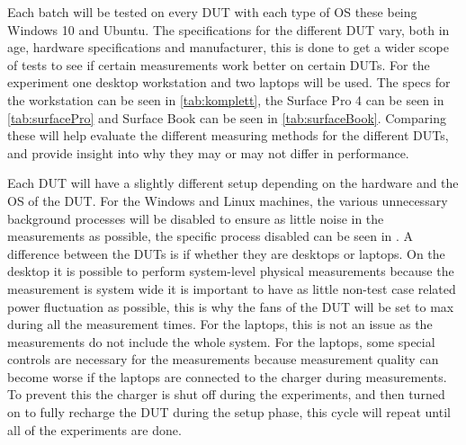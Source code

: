Each batch will be tested on every DUT with each type of OS these being Windows 10 and Ubuntu.
The specifications for the different DUT vary, both in age, hardware specifications and manufacturer, this is done to get a wider scope of tests to see if certain measurements work better on certain DUTs. For the experiment one desktop workstation and two laptops will be used. The specs for the workstation can be seen in \cref{tab:komplett}, the Surface Pro 4 can be seen in \cref{tab:surfacePro} and Surface Book can be seen in \cref*{tab:surfaceBook}. Comparing these will help evaluate the different measuring methods for the different DUTs, and provide insight into why they may or may not differ in performance.


Each DUT will have a slightly different setup depending on the hardware and the OS of the DUT. For the Windows and Linux machines, the various unnecessary background processes will be disabled to ensure as little noise in the measurements as possible\cite*[]{sestoft2013microbenchmarks}, the specific process disabled can be seen in . A difference between the DUTs is if whether they are desktops or laptops. On the desktop it is possible to perform system-level physical measurements because the measurement is system wide it is important to have as little non-test case related power fluctuation as possible, this is why the fans of the DUT will be set to max during all the measurement times. For the laptops, this is not an issue as the measurements do not include the whole system. For the laptops, some special controls are necessary for the measurements because measurement quality can become worse if the laptops are connected to the charger during measurements\cite{E3Video}. To prevent this the charger is shut off during the experiments, and then turned on to fully recharge the DUT during the setup phase, this cycle will repeat until all of the experiments are done.
